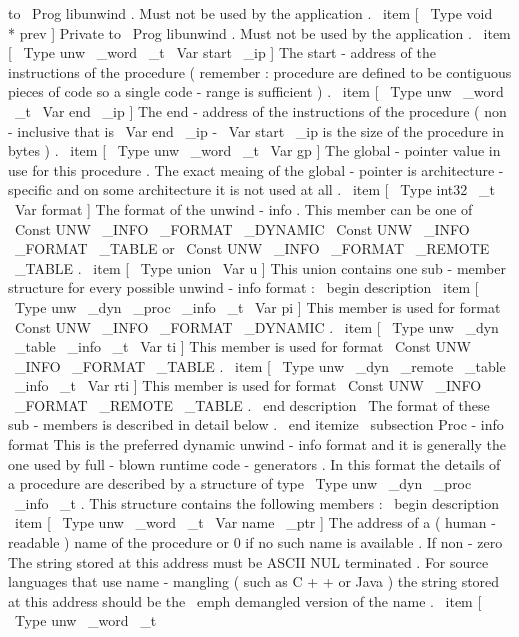 to
\
Prog
{
libunwind
}
.
Must
not
be
used
by
the
application
.
\
item
[
\
Type
{
void
~
*
}
prev
]
Private
to
\
Prog
{
libunwind
}
.
Must
not
be
used
by
the
application
.
\
item
[
\
Type
{
unw
\
_word
\
_t
}
\
Var
{
start
\
_ip
}
]
The
start
-
address
of
the
instructions
of
the
procedure
(
remember
:
procedure
are
defined
to
be
contiguous
pieces
of
code
so
a
single
code
-
range
is
sufficient
)
.
\
item
[
\
Type
{
unw
\
_word
\
_t
}
\
Var
{
end
\
_ip
}
]
The
end
-
address
of
the
instructions
of
the
procedure
(
non
-
inclusive
that
is
\
Var
{
end
\
_ip
}
-
\
Var
{
start
\
_ip
}
is
the
size
of
the
procedure
in
bytes
)
.
\
item
[
\
Type
{
unw
\
_word
\
_t
}
\
Var
{
gp
}
]
The
global
-
pointer
value
in
use
for
this
procedure
.
The
exact
meaing
of
the
global
-
pointer
is
architecture
-
specific
and
on
some
architecture
it
is
not
used
at
all
.
\
item
[
\
Type
{
int32
\
_t
}
\
Var
{
format
}
]
The
format
of
the
unwind
-
info
.
This
member
can
be
one
of
\
Const
{
UNW
\
_INFO
\
_FORMAT
\
_DYNAMIC
}
\
Const
{
UNW
\
_INFO
\
_FORMAT
\
_TABLE
}
or
\
Const
{
UNW
\
_INFO
\
_FORMAT
\
_REMOTE
\
_TABLE
}
.
\
item
[
\
Type
{
union
}
\
Var
{
u
}
]
This
union
contains
one
sub
-
member
structure
for
every
possible
unwind
-
info
format
:
\
begin
{
description
}
\
item
[
\
Type
{
unw
\
_dyn
\
_proc
\
_info
\
_t
}
\
Var
{
pi
}
]
This
member
is
used
for
format
\
Const
{
UNW
\
_INFO
\
_FORMAT
\
_DYNAMIC
}
.
\
item
[
\
Type
{
unw
\
_dyn
\
_table
\
_info
\
_t
}
\
Var
{
ti
}
]
This
member
is
used
for
format
\
Const
{
UNW
\
_INFO
\
_FORMAT
\
_TABLE
}
.
\
item
[
\
Type
{
unw
\
_dyn
\
_remote
\
_table
\
_info
\
_t
}
\
Var
{
rti
}
]
This
member
is
used
for
format
\
Const
{
UNW
\
_INFO
\
_FORMAT
\
_REMOTE
\
_TABLE
}
.
\
end
{
description
}
\
The
format
of
these
sub
-
members
is
described
in
detail
below
.
\
end
{
itemize
}
\
subsection
{
Proc
-
info
format
}
This
is
the
preferred
dynamic
unwind
-
info
format
and
it
is
generally
the
one
used
by
full
-
blown
runtime
code
-
generators
.
In
this
format
the
details
of
a
procedure
are
described
by
a
structure
of
type
\
Type
{
unw
\
_dyn
\
_proc
\
_info
\
_t
}
.
This
structure
contains
the
following
members
:
\
begin
{
description
}
\
item
[
\
Type
{
unw
\
_word
\
_t
}
\
Var
{
name
\
_ptr
}
]
The
address
of
a
(
human
-
readable
)
name
of
the
procedure
or
0
if
no
such
name
is
available
.
If
non
-
zero
The
string
stored
at
this
address
must
be
ASCII
NUL
terminated
.
For
source
languages
that
use
name
-
mangling
(
such
as
C
+
+
or
Java
)
the
string
stored
at
this
address
should
be
the
\
emph
{
demangled
}
version
of
the
name
.
\
item
[
\
Type
{
unw
\
_word
\
_t
}
